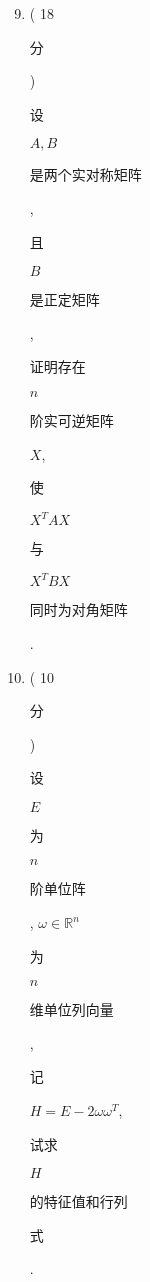\documentclass[10pt]{article}
\begin{document}
\begin{enumerate}
  \setcounter{enumi}{8}
  \item ( 18 \begin{CJK}{UTF8}{mj}分\end{CJK}) \begin{CJK}{UTF8}{mj}设\end{CJK} $A, B$ \begin{CJK}{UTF8}{mj}是两个实对称矩阵\end{CJK}, \begin{CJK}{UTF8}{mj}且\end{CJK} $B$ \begin{CJK}{UTF8}{mj}是正定矩阵\end{CJK}, \begin{CJK}{UTF8}{mj}证明存在\end{CJK} $n$ \begin{CJK}{UTF8}{mj}阶实可逆矩阵\end{CJK} $X$, \begin{CJK}{UTF8}{mj}使\end{CJK} $X^{T} A X$ \begin{CJK}{UTF8}{mj}与\end{CJK} $X^{T} B X$ \begin{CJK}{UTF8}{mj}同时为对角矩阵\end{CJK}.

  \item ( 10 \begin{CJK}{UTF8}{mj}分\end{CJK}) \begin{CJK}{UTF8}{mj}设\end{CJK} $E$ \begin{CJK}{UTF8}{mj}为\end{CJK} $n$ \begin{CJK}{UTF8}{mj}阶单位阵\end{CJK}, $\omega \in \mathbb{R}^{n}$ \begin{CJK}{UTF8}{mj}为\end{CJK} $n$ \begin{CJK}{UTF8}{mj}维单位列向量\end{CJK}, \begin{CJK}{UTF8}{mj}记\end{CJK} $H=E-2 \omega \omega^{T}$, \begin{CJK}{UTF8}{mj}试求\end{CJK} $H$ \begin{CJK}{UTF8}{mj}的特征值和行列\end{CJK} \begin{CJK}{UTF8}{mj}式\end{CJK}.

\end{enumerate}
\end{document}
